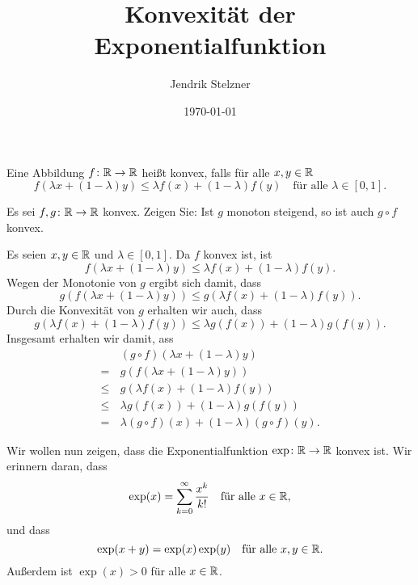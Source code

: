 \documentclass[a4paper,10pt]{article}
\title{Konvexität der Exponentialfunktion}
\author{Jendrik Stelzner}
\date{\today}
\begin{document}
\maketitle


\begin{defi}
 Eine Abbildung $f \colon \mathbb{R} \to \mathbb{R}$ heißt konvex, falls für alle $x,y \in \mathbb{R}$
 \[
  f(\lambda x + (1-\lambda)y) \leq \lambda f(x) + (1-\lambda) f(y)
  \quad \text{für alle $\lambda \in [0,1]$}.
 \]
\end{defi}


\begin{question}
 Es sei $f, g \colon \mathbb{R} \to \mathbb{R}$ konvex. Zeigen Sie: Ist $g$ monoton steigend, so ist auch $g \circ f$ konvex.
\end{question}
\begin{solution}
 Es seien $x,y \in \mathbb{R}$ und $\lambda \in [0,1]$. Da $f$ konvex ist, ist
 \[
  f(\lambda x + (1-\lambda)y) \leq \lambda f(x) + (1-\lambda) f(y).
 \]
 Wegen der Monotonie von $g$ ergibt sich damit, dass
 \[
  g(f(\lambda x + (1-\lambda)y)) \leq g(\lambda f(x) + (1-\lambda) f(y)).
 \]
 Durch die Konvexität von $g$ erhalten wir auch, dass
 \[
  g(\lambda f(x) + (1-\lambda) f(y))
  \leq \lambda g(f(x)) + (1-\lambda) g(f(y)).
 \]
 Insgesamt erhalten wir damit, ass
 \begin{align*}
      &\, (g \circ f)(\lambda x + (1-\lambda) y) \\
     =&\, g(f(\lambda x + (1-\lambda) y)) \\
  \leq&\, g(\lambda f(x) + (1-\lambda) f(y)) \\
  \leq&\, \lambda g(f(x)) + (1-\lambda) g(f(y)) \\
     =&\, \lambda (g \circ f)(x) + (1-\lambda) (g \circ f)(y).
 \end{align*}
\end{solution}


Wir wollen nun zeigen, dass die Exponentialfunktion $\exp \colon \mathbb{R} \to \mathbb{R}$ konvex ist. Wir erinnern daran, dass
\[
 \exp(x) = \sum_{k=0}^\infty \frac{x^k}{k!} \quad \text{für alle $x \in \mathbb{R}$},
\]
und dass
\begin{equation}\label{eqn: exp Gruppenhomo}
 \exp(x+y) = \exp(x) \exp(y) \quad \text{für alle $x,y \in \mathbb{R}$}.
\end{equation}
Außerdem ist $\exp(x) > 0$ für alle $x \in \mathbb{R}$.
\end{document}
